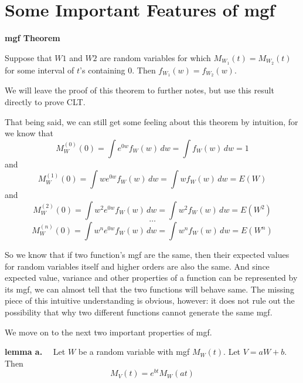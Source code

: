 \documentclass[11pt]{article}
\begin{document}
\section {\large Some Important Features of mgf}

\begin{tcolorbox}[
	enhanced, 
	width=\textwidth, 
	fontupper=\normalsize,%
	drop fuzzy shadow southwest,
	boxrule=0.4pt,
	sharp corners,
	colframe=yellow!80!black,
	colback=yellow!10]
	
\textbf{\color{RoyalBlue} mgf Theorem} 

\qquad Suppose that $W1$ and $W2$ are random variables for which $M_{W_1} (t) = M_{W_2} (t)$ for some interval of $t$'s containing $0$.  Then $f_{W_1} (w) = f_{W_2} (w)$.

\end{tcolorbox}

We will leave the proof of this theorem to further notes,  but use this result directly to prove CLT. 

That being said,  we can still get some feeling about this theorem by intuition,  for we know that
$$ M ^{(0)} _W (0) = \int e^{0w} f_W (w) \, dw = \int f_W (w) \, dw = 1$$ and
$$ M ^{(1)} _W (0) = \int w e^{0w} f_W (w) \, dw =  \int w  f_W (w) \, dw = E(W) $$ and
$$ M ^{(2)} _W (0) = \int w^2 e^{0w} f_W (w) \, dw = \int w^2  f_W (w) \, dw = E(W^2) $$
$$ \dots $$
$$ M ^{(n)} _W (0) = \int w^n e^{0w} f_W (w) \, dw = \int w^n  f_W (w) \, dw = E(W^n) $$

So we know that if two function's mgf are the same,  then their expected values for random variables itself and higher orders are also the same.  And since expected value,  variance and other properties of a function can be represented by its mgf,  we can almost tell that the two functions will behave same.   The missing piece of this intuitive understanding is obvious,  however: it does not rule out the possibility that why two different functions cannot generate the same mgf. 

We move on to the next two important properties of mgf.

\begin{tcolorbox}[
	enhanced, 
	width=\textwidth, 
	fontupper=\normalsize,%
	drop fuzzy shadow southwest,
	boxrule=0.4pt,
	sharp corners,
	colframe=yellow!80!black,
	colback=yellow!10]
	
\textbf{\color{RoyalBlue} lemma a.}  \ \ Let $W$ be a random variable with mgf $M_W (t)$.  Let $V=aW + b$.  Then
$$
M_V (t) = e^{bt} M_W (at)
$$

\end{tcolorbox}
\end{document}
